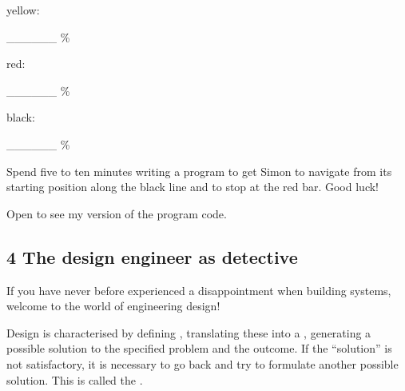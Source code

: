 \documentclass[letterpaper,10pt,english]{sphinxmanual}
\begin{document}
{yellow:





\_\_\_\_\_\_ \%









red:





\_\_\_\_\_\_ \%









black:





\_\_\_\_\_\_ \%









Spend five to ten minutes writing a program to get Simon to navigate from its starting position along the black line and to stop at the red bar. Good luck!

Open  to see my version of the program code.

{
\begin{sphinxVerbatim}[commandchars=\\\{\}]
\llap{\color{nbsphinxin}[ ]:\,\hspace{\fboxrule}\hspace{\fboxsep}}
\end{sphinxVerbatim}
}


\subsection{4 The design engineer as detective}
\label{\detokenize{content/04_Robot_Lab/Section_00_04:4-The-design-engineer-as-detective}}\label{\detokenize{content/04_Robot_Lab/Section_00_04::doc}}
If you have never before experienced a disappointment when building systems, welcome to the world of engineering design!

Design is characterised by defining , translating these into a , generating a possible solution to the specified problem and  the outcome. If the “solution” is not satisfactory, it is necessary to go back and try to formulate another possible solution. This is called the  .

}
\end{document}
